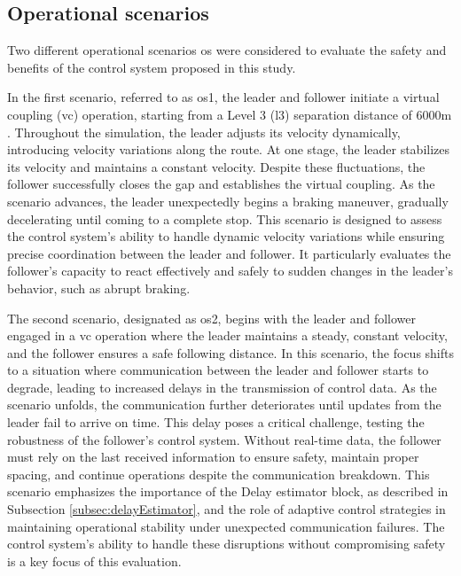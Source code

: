 \documentclass[letterpaper, 10 pt, conference]{ieeeconf}
\theoremstyle{definition}
\theoremstyle{nopoint}
\begin{document}
  		
  
  




 \subsection{Operational scenarios}
  \label{sec:OperationalScenarios}
  
  Two different operational scenarios \gls{os} were considered to evaluate the safety and benefits of the control system proposed in this study.
  
  In the first scenario, referred to as \gls{os}1, the leader and follower initiate a virtual coupling (\gls{vc}) operation, starting from a Level 3 (\gls{l3}) separation distance of $6000\unit{\meter}$. Throughout the simulation, the leader adjusts its velocity dynamically, introducing velocity variations along the route. At one stage, the leader stabilizes its velocity and maintains a constant velocity. Despite these fluctuations, the follower successfully closes the gap and establishes the virtual coupling. As the scenario advances, the leader unexpectedly begins a braking maneuver, gradually decelerating until coming to a complete stop. This scenario is designed to assess the control system’s ability to handle dynamic velocity variations while ensuring precise coordination between the leader and follower. It particularly evaluates the follower’s capacity to react effectively and safely to sudden changes in the leader’s behavior, such as abrupt braking.
  
  The second scenario, designated as \gls{os}2, begins with the leader and follower engaged in a \gls{vc} operation where the leader maintains a steady, constant velocity, and the follower ensures a safe following distance. In this scenario, the focus shifts to a situation where communication between the leader and follower starts to degrade, leading to increased delays in the transmission of control data. As the scenario unfolds, the communication further deteriorates until updates from the leader fail to arrive on time. This delay poses a critical challenge, testing the robustness of the follower’s control system. Without real-time data, the follower must rely on the last received information to ensure safety, maintain proper spacing, and continue operations despite the communication breakdown. This scenario emphasizes the importance of the Delay estimator block, as described in Subsection \ref{subsec:delayEstimator}, and the role of adaptive control strategies in maintaining operational stability under unexpected communication failures. The control system’s ability to handle these disruptions without compromising safety is a key focus of this evaluation.
  
\end{document}
